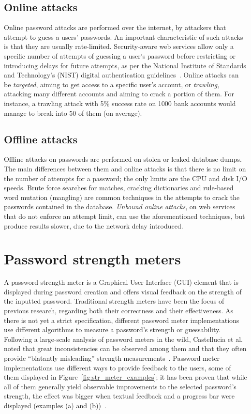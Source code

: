     \subsection{Online attacks}
      \label{ssec:online_attacks}
      Online password attacks are performed over the internet, by attackers that attempt to guess a users' passwords. An important characteristic of such attacks is that they are usually rate-limited. Security-aware web services allow only a specific number of attempts of guessing a user's password before restricting or introducing delays for future attempts, as per the National Institute of Standards and Technology's (NIST) digital authentication guidelines~\cite{NIST}. Online attacks can be \emph{targeted}, aiming to get access to a specific user's account, or \emph{trawling}, attacking many different accounts and aiming to crack a portion of them. For instance, a trawling attack with 5\% success rate on 1000 bank accounts would manage to break into 50 of them (on average).

    \subsection{Offline attacks}
      \label{ssec:offline_attacks}
      Offline attacks on passwords are performed on stolen or leaked database dumps. The main differences between them and online attacks is that there is no limit on the number of attempts for a password; the only limits are the CPU and disk I/O speeds. Brute force searches for matches, cracking dictionaries and rule-based word mutation (mangling) are common techniques in the attempts to crack the passwords contained in the database. \emph{Unbound online attacks}, on web services that do not enforce an attempt limit, can use the aforementioned techniques, but produce results slower, due to the network delay introduced.


  \section{Password strength meters}
    \label{sec:pass_str_meters}
    A password strength meter is a Graphical User Interface (GUI) element that is displayed during password creation and offers visual feedback on the strength of the inputted password. Traditional strength meters have been the focus of previous research, regarding both their correctness and their effectiveness. As there is not yet a strict specification, different password meter implementations use different algorithms to measure a password's strength or guessability. Following a large-scale analysis of password meters in the wild, Castellucia et al. noted that great inconsistencies can be observed among them and that they often provide ``blatantly misleading'' strength measurements~\cite{pass_str_meter_analysis}. Password meter implementations use different ways to provide feedback to the users, some of them displayed in Figure~\ref{fig:str_meter_examples}; it has been proven that while all of them generally yield observable improvements to the selected password's strength, the effect was bigger when textual feedback and a progress bar were displayed (examples (a) and (b))~\cite{strength_meter_effect}.

